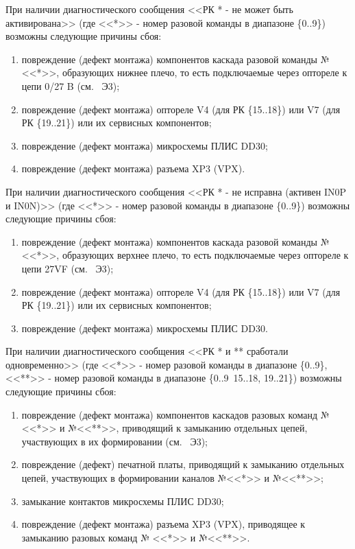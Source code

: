 \begin{sloppypar}
   \end{sloppypar}
   
  \begin{sloppypar}
    
   \subpoint При наличии диагностического сообщения <<РК * - не может быть активирована>> 
	    (где <<*>> - номер разовой команды в диапазоне \{0..9\}) возможны следующие причины сбоя:
      \begin{enumerate}
	\item повреждение (дефект монтажа) компонентов каскада разовой команды № <<*>>, образующих нижнее плечо, 
	      то есть подключаемые через оптореле к цепи 0/27 B (см. \DocProductSignature~Э3);
	\item повреждение (дефект монтажа) оптореле V4 (для РК \{15..18\}) или V7 (для РК \{19..21\}) или их сервисных компонентов;
	\item повреждение (дефект монтажа) микросхемы ПЛИС DD30;
	\item повреждение (дефект монтажа) разъема XP3 (VPX).
      \end{enumerate}
      
      \subpoint При наличии диагностического сообщения <<РК * - не исправна (активен IN0P и IN0N)>> 
		(где <<*>> - номер разовой команды в диапазоне \{0..9\}) возможны следующие причины сбоя:
      \begin{enumerate}
	\item повреждение (дефект монтажа) компонентов каскада разовой команды № <<*>>, образующих верхнее плечо, 
	      то есть подключаемые через оптореле к цепи 27VF (см. \DocProductSignature~Э3);
	\item повреждение (дефект монтажа) оптореле V4 (для РК \{15..18\}) или V7 (для РК \{19..21\}) или их сервисных компонентов;
	\item повреждение (дефект монтажа) микросхемы ПЛИС DD30.
      \end{enumerate}
      
      \subpoint При наличии диагностического сообщения <<РК * и ** сработали одновременно>> 
		(где <<*>> - номер разовой команды в диапазоне \{0..9\}, <<**>> - номер разовой команды в диапазоне \{0..9\, 15..18, 19..21\}) возможны следующие причины сбоя:
      \begin{enumerate}
	\item повреждение (дефект монтажа) компонентов каскадов разовых команд № <<*>> и №<<**>>, 
	      приводящий к замыканию отдельных цепей, участвующих в их формировании (см. \DocProductSignature~Э3);
	\item повреждение (дефект) печатной платы, приводящий к замыканию отдельных цепей, участвующих в формировании каналов №<<*>> и №<<**>>;
	\item замыкание контактов микросхемы ПЛИС DD30;
	\item повреждение (дефект монтажа) разъема XP3 (VPX), приводящее к замыканию разовых команд № <<*>> и №<<**>>.
      \end{enumerate}  
    

\end{sloppypar}
